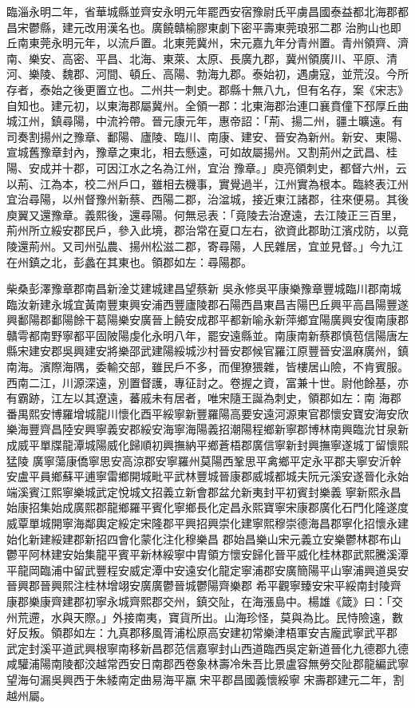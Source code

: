 \begin{pinyinscope}
 臨淄永明二年，省華城縣並齊安永明元年罷西安宿豫尉氏平虜昌國泰益都北海郡都昌宋鬱縣，建元改用漢名也。廣饒贛榆膠東劇下密平壽東莞琅邪二郡
 治朐山也即丘南東莞永明元年，以流戶置。北東莞冀州，宋元嘉九年分青州置。青州領齊、濟南、樂安、高密、平昌、北海、東萊、太原、長廣九郡，冀州領廣川、平原、清河、樂陵、魏郡、河間、頓丘、高陽、勃海九郡。泰始初，遇虜寇，並荒沒。今所存者，泰始之後更置立也。二州共一刺史。郡縣十無八九，但有名存，案《宋志》自知也。建元初，以東海郡屬冀州。全領一郡：北東海郡治連口襄賁僮下邳厚丘曲城江州，鎮尋陽，中流衿帶。晉元康元年，惠帝詔：「荊、揚二州，疆土曠遠。有司奏割揚州之豫章、鄱陽、廬陵、臨川、南康、建安、晉安為新州。新安、東陽、宣城舊豫章封內，豫章之東北，相去懸遠，可如故屬揚州。又割荊州之武昌、桂陽、安成并十郡，可因江水之名為江州，宜治
 豫章。」庾亮領刺史，都督六州，云以荊、江為本，校二州戶口，雖相去機事，實覺過半，江州實為根本。臨終表江州宜治尋陽，以州督豫州新蔡、西陽二郡，治湓城，接近東江諸郡，往來便易。其後庾翼又還豫章。義熙後，還尋陽。何無忌表：「竟陵去治遼遠，去江陵正三百里，荊州所立綏安郡民戶，參入此境，郡治常在夏口左右，欲資此郡助江濱戍防，以竟陵還荊州。又司州弘農、揚州松滋二郡，寄尋陽，人民雜居，宜並見督。」今九江在州鎮之北，彭蠡在其東也。領郡如左：尋陽郡。



 柴桑彭澤豫章郡南昌新淦艾建城建昌望蔡新
 吳永修吳平康樂豫章豐城臨川郡南城臨汝新建永城宜黃南豐東興安浦西豐廬陵郡石陽西昌東昌吉陽巴丘興平高昌陽豐遂興鄱陽郡鄱陽餘干葛陽樂安廣晉上饒安成郡平都新喻永新萍鄉宜陽廣興安復南康郡
 贛雩都南野寧都平固陂陽虔化永明八年，罷安遠縣並。南康南新蔡郡慎苞信陽唐左縣宋建安郡吳興建安將樂邵武建陽綏城沙村晉安郡候官羅江原豐晉安溫麻廣州，鎮南海。濱際海隅，委輸交部，雖民戶不多，而俚獠猥雜，皆樓居山險，不肯賓服。西南二江，川源深遠，別置督護，專征討之。卷握之資，富兼十世。尉他餘基，亦有霸跡，江左以其遼遠，蕃戚未有居者，唯宋隨王誕為刺史，領郡如左：南
 海郡番禺熙安博羅增城龍川懷化酉平綏寧新豐羅陽高要安遠河源東官郡懷安寶安海安欣樂海豐齊昌陸安興寧義安郡綏安海寧海陽義招潮陽程鄉新寧郡博林南興臨沇甘泉新成威平單牒龍潭城陽威化歸順初興撫納平鄉蒼梧郡廣信寧新封興撫寧遂城丁留懷熙猛陵
 廣寧蕩康僑寧思安高涼郡安寧羅州莫陽西鞏思平禽鄉平定永平郡夫寧安沂幹安盧平員鄉蘇平逋寧雷鄉開城毗平武林豐城晉康郡威城都城夫阮元溪安遂晉化永始端溪賓江熙寧樂城武定悅城文招義立新會郡盆允新夷封平初賓封樂義
 寧新熙永昌始康招集始成廣熙郡龍鄉羅平賓化寧鄉長化定昌永熙寶寧宋康郡廣化石門化隆遂度威覃單城開寧海鄰輿定綏定宋隆郡平興招興崇化建寧熙穆崇德海昌郡寧化招懷永建始化新建綏建郡新招四會化蒙化注化穆樂昌
 郡始昌樂山宋元義立安樂鬱林郡布山鬱平阿林建安始集龍平賓平新林綏寧中胄領方懷安歸化晉平威化桂林郡武熙騰溪潭平龍岡臨浦中留武豐程安威定潭中安遠安化龍定寧浦郡安廣簡陽平山寧浦興道吳安晉興郡晉興熙注桂林增翊安廣廣鬱晉城鬱陽齊樂郡
 希平觀寧臻安宋平綏南封陵齊康郡樂康齊建郡初寧永城齊熙郡交州，鎮交阯，在海漲島中。楊雄《箴》曰：「交州荒遰，水與天際。」外接南夷，寶貨所出。山海珍怪，莫與為比。民恃險遠，數好反叛。領郡如左：九真郡移風胥浦松原高安建初常樂津梧軍安吉龐武寧武平郡
 武定封溪平道武興根寧南移新昌郡范信嘉寧封山西道臨西吳定新道晉化九德郡九德咸驩浦陽南陵都洨越常西安日南郡西卷象林壽冷朱吾比景盧容無勞交阯郡龍編武寧望海句漏吳興西于朱緌南定曲易海平羸𨻻宋平郡昌國義懷綏寧
 宋壽郡建元二年，割越州屬。




\end{pinyinscope}
